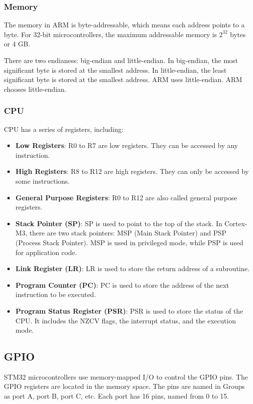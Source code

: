 \documentclass[a4paper,12pt]{article}
\begin{document}
\subsubsection{Memory}

The memory in ARM is byte-addressable, which means each address points to a byte. For 32-bit microcontrollers, the maximum addressable memory is $2^{32}$ bytes or 4 GB.

There are two endianess: big-endian and little-endian. In big-endian, the most significant byte is stored at the smallest address. In little-endian, the least significant byte is stored at the smallest address. ARM uses little-endian. ARM chooses little-endian.

\subsubsection{CPU}

CPU has a series of registers, including:
\begin{itemize}
	\item \textbf{Low Registers}: R0 to R7 are low registers. They can be accessed by any instruction.
	\item \textbf{High Registers}: R8 to R12 are high registers. They can only be accessed by some instructions.
	\item \textbf{General Purpose Registers}: R0 to R12 are also called general purpose registers.
	\item \textbf{Stack Pointer (SP)}: SP is used to point to the top of the stack. In Cortex-M3, there are two stack pointers: MSP (Main Stack Pointer) and PSP (Process Stack Pointer). MSP is used in privileged mode, while PSP is used for application code.
	\item \textbf{Link Register (LR)}: LR is used to store the return address of a subroutine.
	\item \textbf{Program Counter (PC)}: PC is used to store the address of the next instruction to be executed.
	\item \textbf{Program Status Register (PSR)}: PSR is used to store the status of the CPU. It includes the NZCV flags, the interrupt status, and the execution mode.
\end{itemize}

\subsection{GPIO}

STM32 microcontrollers use memory-mapped I/O to control the GPIO pins. The GPIO registers are located in the memory space. The pins are named in Groups as port A, port B, port C, etc. Each port has 16 pins, named from 0 to 15.
\end{document}
